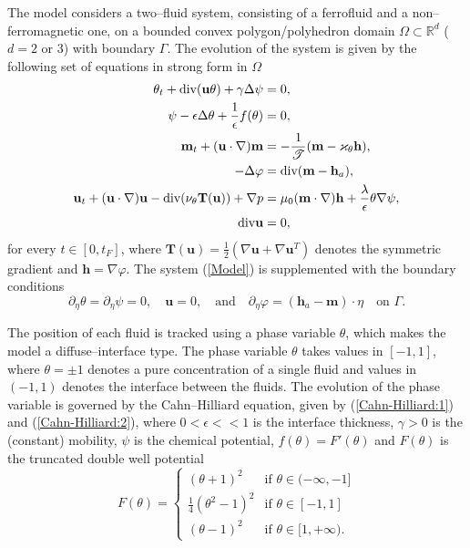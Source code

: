 \documentclass[11pt,fullpage]{article}
\newcommand{\lap}{\Delta}
\newcommand{\Real}{\mathbb R}
\newcommand{\eps}{\epsilon}
\newcommand{\grad}{\nabla}
\newcommand{\diver}{\textup{div} }
\theoremstyle{lemma}
\theoremstyle{definition}
\theoremstyle{lemma}
\begin{document}
The model considers a two--fluid system, consisting of a ferrofluid and a non--ferromagnetic one, on a bounded convex polygon/polyhedron domain $\Omega\subset \Real^d$ ($d=2$ or $3$) with boundary $\Gamma$. The evolution of the system is given by the following set of equations in strong form in $\Omega$
\begin{subequations}\label{Model}
	\begin{align}
	\label{Cahn-Hilliard:1}\theta_t + \diver(\mathbf{u}\theta) + \gamma \lap \psi &= 0,\\
	\label{Cahn-Hilliard:2}\psi - \eps \lap \theta + \frac{1}{\eps}f(\theta) &= 0,\\
	\label{Advection-Reaction}\mathbf{m}_t + (\mathbf{u}\cdot \grad)\mathbf{m}&=-\frac{1}{\mathscr{T}}(\mathbf{m} - \varkappa_\theta\mathbf{h}),\\
	\label{MagScalarPot}-\lap \varphi &=\diver(\mathbf{m}-\mathbf{h}_a),\\
	\label{NavierStokes}\mathbf{u}_t + (\mathbf{u}\cdot\grad)\mathbf{u} - \diver (\nu_\theta \mathbf{T(u)}) + \grad p &= \mu_0(\mathbf{m}\cdot \grad)\mathbf{h} + \frac{\lambda}{\eps}\theta\grad \psi,\\
	\label{DivFree}\diver \mathbf{u} &= 0,
	\end{align}
\end{subequations}
for every $t\in[0,t_F]$, where $\mathbf{T(u)}=\frac{1}{2}(\grad \mathbf{u} + \grad\mathbf{u}^T)$ denotes the symmetric gradient and $\mathbf{h}=\grad \varphi$. The system (\ref{Model}) is supplemented with the boundary conditions
\begin{equation}\label{ModelBC}
	\partial_\eta \theta = \partial_\eta\psi = 0,\quad \mathbf{u}=0,\quad\text{and}\quad \partial_\eta\varphi = (\mathbf{h}_a - \mathbf{m})\cdot\eta \quad \text{on }\Gamma.
\end{equation}

The position of each fluid is tracked using a phase variable $\theta$, which makes the model a diffuse--interface type. The phase variable $\theta$ takes values in $[-1,1]$, where $\theta = \pm 1$ denotes a pure concentration of a single fluid and values in $(-1,1)$ denotes the interface between the fluids. The evolution of the phase variable is governed by the Cahn--Hilliard equation, given by (\ref{Cahn-Hilliard:1}) and (\ref{Cahn-Hilliard:2}), where $0< \eps <<1$ is the interface thickness, $\gamma>0$ is the (constant) mobility, $\psi$ is the chemical potential, $f(\theta)=F'(\theta)$ and $F(\theta)$ is the truncated double well potential
\begin{equation}\label{DoublePotent}
	F(\theta) = \begin{cases}
	(\theta + 1)^2 &\text{if }\theta\in(-\infty,-1]\\
	\frac{1}{4}(\theta^2 - 1)^2 &\text{if }\theta\in[-1,1]\\
	(\theta -1)^2 &\text{if }\theta\in[1,+\infty).
	\end{cases}
\end{equation}
\end{document}
